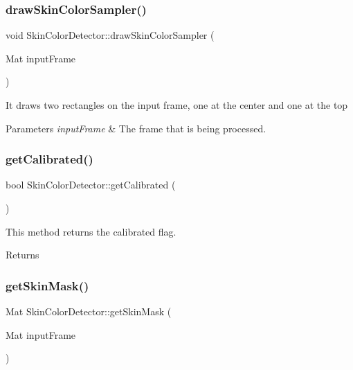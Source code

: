 \subsubsection{\texorpdfstring{draw\+Skin\+Color\+Sampler()}{drawSkinColorSampler()}}
{\footnotesize\ttfamily void Skin\+Color\+Detector\+::draw\+Skin\+Color\+Sampler (\begin{DoxyParamCaption}\item[{Mat}]{input\+Frame }\end{DoxyParamCaption})}

It draws two rectangles on the input frame, one at the center and one at the top


\begin{DoxyParams}{Parameters}
{\em input\+Frame} & The frame that is being processed. \\
\hline
\end{DoxyParams}
\mbox{\label{classGestureDetection_1_1SkinColorDetector_ad02c96fbc75934c86d22dd90ee726373}} 
\subsubsection{\texorpdfstring{get\+Calibrated()}{getCalibrated()}}
{\footnotesize\ttfamily bool Skin\+Color\+Detector\+::get\+Calibrated (\begin{DoxyParamCaption}{ }\end{DoxyParamCaption})}

This method returns the calibrated flag. \begin{DoxyReturn}{Returns}

\end{DoxyReturn}
\mbox{\label{classGestureDetection_1_1SkinColorDetector_a8cf2f51c4c7797a126b767e48458a006}} 
\subsubsection{\texorpdfstring{get\+Skin\+Mask()}{getSkinMask()}}
{\footnotesize\ttfamily Mat Skin\+Color\+Detector\+::get\+Skin\+Mask (\begin{DoxyParamCaption}\item[{Mat}]{input\+Frame }\end{DoxyParamCaption})}


